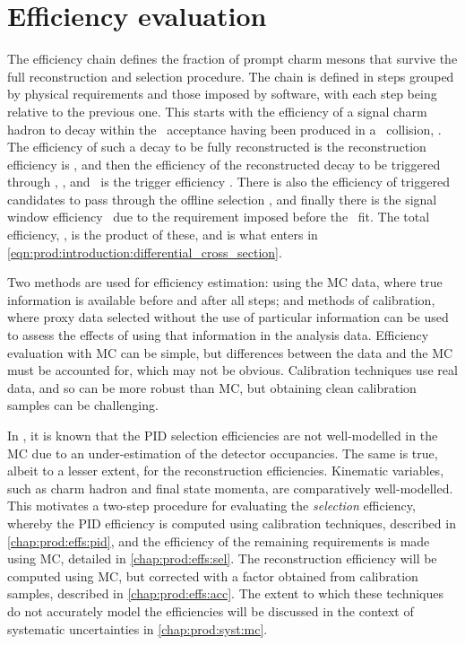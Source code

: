 \chapter{Efficiency evaluation}
\label{chap:prod:effs}

The efficiency chain defines the fraction of prompt charm mesons that survive 
the full reconstruction and selection procedure.
The chain is defined in steps grouped by physical requirements and those 
imposed by software, with each step being relative to the previous one.
This starts with the efficiency of a signal charm hadron to decay within the 
\lhcb\ acceptance having been produced in a \pp\ collision, \effacc.
The efficiency of such a decay to be fully reconstructed is the reconstruction 
efficiency is \effreco, and then the efficiency of the reconstructed decay to 
be triggered through \lzero, \hltone, and \hlttwo\ is the trigger efficiency 
\efftrig.
There is also the efficiency of triggered candidates to pass through the 
offline selection \effoffline, and finally there is the signal window 
efficiency \effsigwin\ due to the requirement imposed before the \lnipchisq\ 
fit.
The total efficiency, \eff, is the product of these, and is what enters in 
\cref{eqn:prod:introduction:differential_cross_section}.

Two methods are used for efficiency estimation: using the \acf{MC} data, where 
true information is available before and after all steps; and methods of 
calibration, where proxy data selected without the use of particular 
information can be used to assess the effects of using that information in the 
analysis data.
Efficiency evaluation with \ac{MC} can be simple, but differences between the 
data and the \ac{MC} must be accounted for, which may not be obvious.
Calibration techniques use real data, and so can be more robust than \ac{MC}, 
but obtaining clean calibration samples can be challenging.

In \lhcb, it is known that the \ac{PID} selection efficiencies are not 
well-modelled in the \ac{MC} due to an under-estimation of the detector 
occupancies.
The same is true, albeit to a lesser extent, for the reconstruction 
efficiencies.
Kinematic variables, such as charm hadron and final state momenta, are 
comparatively well-modelled.
This motivates a two-step procedure for evaluating the \emph{selection} 
efficiency, whereby the \ac{PID} efficiency is computed using calibration 
techniques, described in \cref{chap:prod:effs:pid}, and the efficiency of the remaining 
requirements is made using \ac{MC}, detailed in \cref{chap:prod:effs:sel}.
The reconstruction efficiency will be computed using \ac{MC}, but corrected 
with a factor obtained from calibration samples, described in \cref{chap:prod:effs:acc}.
The extent to which these techniques do not accurately model the efficiencies 
will be discussed in the context of systematic uncertainties in 
\cref{chap:prod:syst:mc}.

